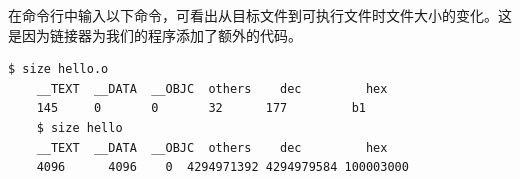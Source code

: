 \begin{frame}[fragile]\ft{\secname}
  在命令行中输入以下命令，可看出从目标文件到可执行文件时文件大小的变化。这是因为链接器为我们的程序添加了额外的代码。
  \begin{lstlisting}[basicstyle=\ttfamily\footnotesize,backgroundcolor=\color{red!10}]
    $ size hello.o
    __TEXT  __DATA  __OBJC  others    dec         hex
    145     0       0       32      177         b1        
    $ size hello
    __TEXT  __DATA  __OBJC  others    dec         hex
    4096      4096    0  4294971392 4294979584 100003000
  \end{lstlisting}

\end{frame}
